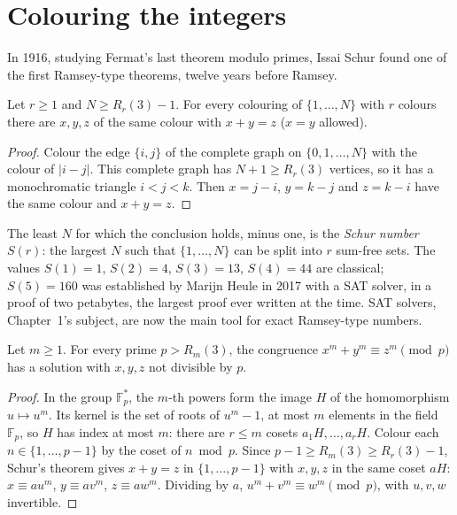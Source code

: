 \section{Colouring the integers}

In 1916, studying Fermat's last theorem modulo primes, Issai Schur found one of the first Ramsey-type theorems, twelve years before Ramsey.

\begin{theorem}[Schur, 1916]\label{thm:schur}
Let $r\ge1$ and $N\ge R_r(3)-1$. For every colouring of $\{1,\dots,N\}$ with $r$ colours there are $x,y,z$ of the same colour with $x+y=z$ ($x=y$ allowed).
\end{theorem}
\begin{proof}
Colour the edge $\{i,j\}$ of the complete graph on $\{0,1,\dots,N\}$ with the colour of $|i-j|$. This complete graph has $N+1\ge R_r(3)$ vertices, so it has a monochromatic
triangle $i<j<k$. Then $x=j-i$, $y=k-j$ and $z=k-i$ have the same colour and $x+y=z$.
\end{proof}

The least $N$ for which the conclusion holds, minus one, is the \emph{Schur number} $S(r)$: the largest $N$ such that $\{1,\dots,N\}$ can be split into $r$ sum-free
sets. The values $S(1)=1$, $S(2)=4$, $S(3)=13$, $S(4)=44$ are classical; $S(5)=160$ was established by Marijn Heule in 2017 with a SAT solver, in a proof of two petabytes,
the largest proof ever written at the time. SAT solvers, Chapter~1's subject, are now the main tool for exact Ramsey-type numbers.

\begin{corollary}\label{cor:schurfermat}
Let $m\ge1$. For every prime $p>R_m(3)$, the congruence $x^m+y^m\equiv z^m\pmod p$ has a solution with $x,y,z$ not divisible by $p$.
\end{corollary}
\begin{proof}
In the group $\mathbb F_p^*$, the $m$-th powers form the image $H$ of the homomorphism $u\mapsto u^m$. Its kernel is the set of roots of $u^m-1$, at most $m$ elements in the field
$\mathbb F_p$, so $H$ has index at most $m$: there are $r\le m$ cosets $a_1H,\dots,a_rH$. Colour each $n\in\{1,\dots,p-1\}$ by the coset of $n\bmod p$. Since
$p-1\ge R_m(3)\ge R_r(3)-1$, Schur's theorem gives $x+y=z$ in $\{1,\dots,p-1\}$ with $x,y,z$ in the same coset $aH$: $x\equiv au^m$, $y\equiv av^m$, $z\equiv aw^m$. Dividing by $a$,
$u^m+v^m\equiv w^m\pmod p$, with $u,v,w$ invertible.
\end{proof}


